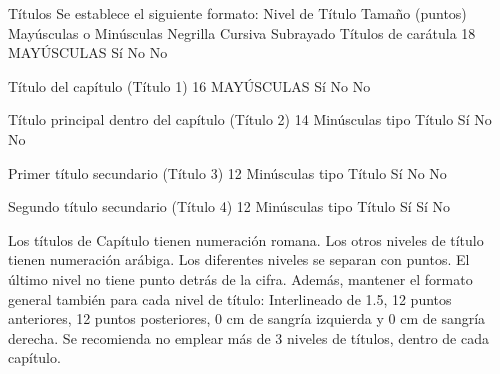 Títulos
Se establece el siguiente formato:
Nivel de Título Tamaño (puntos) Mayúsculas o Minúsculas Negrilla Cursiva Subrayado
Títulos de
carátula
18 MAYÚSCULAS Sí No No

Título del
capítulo
(Título 1)
16 MAYÚSCULAS Sí No No

Título
principal
dentro del
capítulo
(Título 2)
14 Minúsculas tipo
Título
Sí No No

Primer título
secundario
(Título 3)
12 Minúsculas tipo
Título
Sí No No

Segundo
título
secundario
(Título 4)
12 Minúsculas tipo
Título
Sí Sí No

Los títulos de Capítulo tienen numeración romana. Los otros niveles de título tienen
numeración arábiga. Los diferentes niveles se separan con puntos. El último nivel
no tiene punto detrás de la cifra.
Además, mantener el formato general también para cada nivel de título:
Interlineado de 1.5, 12 puntos anteriores, 12 puntos posteriores, 0 cm de sangría
izquierda y 0 cm de sangría derecha.
Se recomienda no emplear más de 3 niveles de títulos, dentro de cada capítulo.



